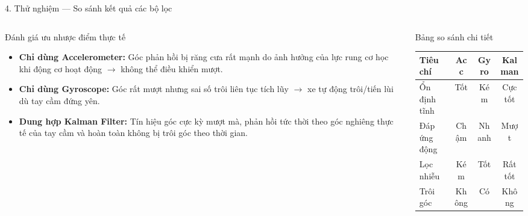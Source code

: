 \documentclass[aspectratio=169, 10pt]{beamer}
\begin{document}
\begin{frame}{4. Thử nghiệm — So sánh kết quả các bộ lọc}
  \begin{columns}[T]
    \begin{column}{0.48\textwidth}
      \begin{block}{Đánh giá ưu nhược điểm thực tế}
        \begin{itemize}
          \item \textbf{Chỉ dùng Accelerometer:} Góc phản hồi bị răng cưa rất mạnh do ảnh hưởng của lực rung cơ học khi động cơ hoạt động $\to$ không thể điều khiển mượt.
          \item \textbf{Chỉ dùng Gyroscope:} Góc rất mượt nhưng sai số trôi liên tục tích lũy $\to$ xe tự động trôi/tiến lùi dù tay cầm đứng yên.
          \item \textbf{Dung hợp Kalman Filter:} Tín hiệu góc cực kỳ mượt mà, phản hồi tức thời theo góc nghiêng thực tế của tay cầm và hoàn toàn không bị trôi góc theo thời gian.
        \end{itemize}
      \end{block}
    \end{column}
    \begin{column}{0.48\textwidth}
      \begin{block}{Bảng so sánh chi tiết}
        \centering
        \scriptsize
        \renewcommand{\arraystretch}{1.2}
        \begin{tabular}{|l|c|c|c|}
          \hline
          \textbf{Tiêu chí} & \textbf{Acc} & \textbf{Gyro} & \textbf{Kalman} \\ \hline
          Ổn định tĩnh & Tốt & Kém & Cực tốt \\ \hline
          Đáp ứng động & Chậm & Nhanh & Mượt \\ \hline
          Lọc nhiễu & Kém & Tốt & Rất tốt \\ \hline
          Trôi góc & Không & Có & Không \\ \hline
        \end{tabular}
      \end{block}
    \end{column}
  \end{columns}
\end{frame}
\end{document}
